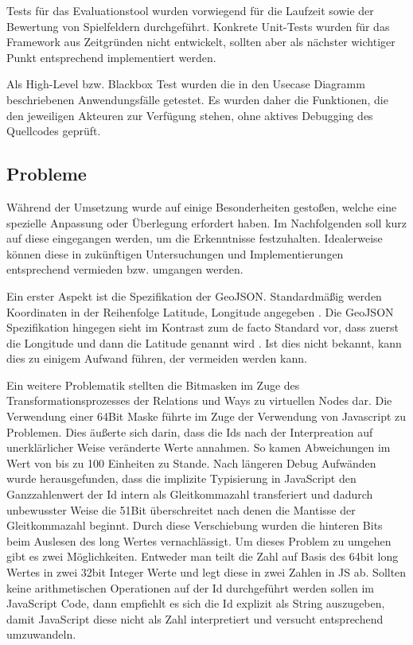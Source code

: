 Tests für das Evaluationstool wurden vorwiegend für die Laufzeit sowie der Bewertung von Spielfeldern durchgeführt.
Konkrete Unit-Tests wurden für das Framework aus Zeitgründen nicht entwickelt, sollten aber als nächster wichtiger Punkt entsprechend implementiert werden.

Als High-Level bzw. Blackbox Test wurden die in den Usecase Diagramm beschriebenen Anwendungsfälle getestet. Es wurden daher die Funktionen, die den jeweiligen Akteuren zur Verfügung stehen, ohne aktives Debugging des Quellcodes geprüft.

\subsection*{Probleme}

Während der Umsetzung wurde auf einige Besonderheiten gestoßen, welche eine spezielle Anpassung oder Überlegung erfordert haben. Im Nachfolgenden soll kurz auf diese eingegangen werden, um die Erkenntnisse festzuhalten. Idealerweise können diese in zukünftigen Untersuchungen und Implementierungen entsprechend vermieden bzw. umgangen werden.

Ein erster Aspekt ist die Spezifikation der GeoJSON. Standardmäßig werden Koordinaten in der Reihenfolge Latitude, Longitude angegeben \cite{Schoeneberger.2002,Barzegar.1996,Maling.1991,}. Die GeoJSON Spezifikation hingegen sieht im Kontrast zum de facto Standard vor, dass zuerst die Longitude und dann die Latitude genannt wird \cite{Butler.2008}. Ist dies nicht bekannt, kann dies zu einigem Aufwand führen, der vermeiden werden kann.

Ein weitere Problematik stellten die Bitmasken im Zuge des Transformationsprozesses der Relations und Ways zu virtuellen Nodes dar. Die Verwendung einer 64Bit Maske führte im Zuge der Verwendung von Javascript zu Problemen. Dies äußerte sich darin, dass die Ids nach der Interpreation auf unerklärlicher Weise veränderte Werte annahmen. So kamen Abweichungen im Wert von bis zu 100 Einheiten zu Stande. Nach längeren Debug Aufwänden wurde herausgefunden, dass die implizite Typisierung in JavaScript den Ganzzahlenwert der Id intern als Gleitkommazahl transferiert und dadurch unbewusster Weise die 51Bit überschreitet nach denen die Mantisse der Gleitkommazahl beginnt. Durch diese Verschiebung wurden die hinteren Bits beim Auslesen des long Wertes vernachlässigt. Um dieses Problem zu umgehen gibt es zwei Möglichkeiten. Entweder man teilt die Zahl auf Basis des 64bit long Wertes in zwei 32bit Integer Werte und legt diese in zwei Zahlen in JS ab. Sollten keine arithmetischen Operationen auf der Id durchgeführt werden sollen im JavaScript Code, dann empfiehlt es sich die Id explizit als String auszugeben, damit JavaScript diese nicht als Zahl interpretiert und versucht entsprechend umzuwandeln.

